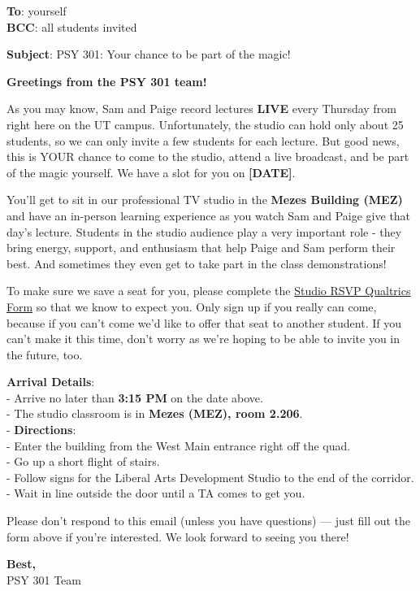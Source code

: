 \documentclass[
]{article}
\begin{document}
\textbf{To}: yourself\\
\textbf{BCC}: all students invited

\textbf{Subject}: PSY 301: Your chance to be part of the magic!

\textbf{Greetings from the PSY 301 team!}

As you may know, Sam and Paige record lectures \textbf{LIVE} every Thursday from right here on the UT campus. Unfortunately, the studio can hold only about 25 students, so we can only invite a few students for each lecture. But good news, this is YOUR chance to come to the studio, attend a live broadcast, and be part of the magic yourself. We have a slot for you on \textbf{{[}DATE{]}}.

You'll get to sit in our professional TV studio in the \textbf{Mezes Building (MEZ)} and have an in-person learning experience as you watch Sam and Paige give that day's lecture. Students in the studio audience play a very important role - they bring energy, support, and enthusiasm that help Paige and Sam perform their best. And sometimes they even get to take part in the class demonstrations!

To make sure we save a seat for you, please complete the \href{\%60r\%20\%60params$studio_recruitment_qualtrics_form\%60}{Studio RSVP Qualtrics Form} so that we know to expect you. Only sign up if you really can come, because if you can't come we'd like to offer that seat to another student. If you can't make it this time, don't worry as we're hoping to be able to invite you in the future, too.

\textbf{Arrival Details}:\\
- Arrive no later than \textbf{3:15 PM} on the date above.\\
- The studio classroom is in \textbf{Mezes (MEZ), room 2.206}.\\
- \textbf{Directions}:\\
- Enter the building from the West Main entrance right off the quad.\\
- Go up a short flight of stairs.\\
- Follow signs for the Liberal Arts Development Studio to the end of the corridor.\\
- Wait in line outside the door until a TA comes to get you.

Please don't respond to this email (unless you have questions) --- just fill out the form above if you're interested. We look forward to seeing you there!

\textbf{Best,}\\
PSY 301 Team
\end{document}
